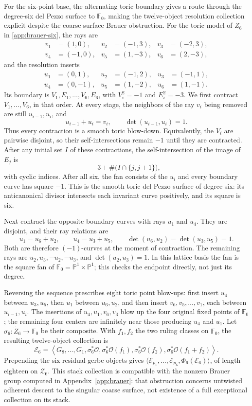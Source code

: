 \documentclass[11pt]{article}
\theoremstyle{plain}
\theoremstyle{definition}
\theoremstyle{remark}
\newcommand{\Pp}{\mathbb P}
\newcommand{\F}{\mathbb F}
\newcommand{\OO}{\mathcal O}
\begin{document}
For the six-point base, the alternating toric boundary gives a route
through the degree-six del Pezzo surface to \(\F_0\), making the
twelve-object resolution collection explicit despite the coarse-surface
Brauer obstruction.
For the toric model of \(Z_6\) in \cref{app:brauer-six}, the rays are
\[
\begin{aligned}
v_1&=(1,0),&v_2&=(-1,3),&v_3&=(-2,3),\\
v_4&=(-1,0),&v_5&=(1,-3),&v_6&=(2,-3),
\end{aligned}
\]
and the resolution inserts
\[
\begin{aligned}
u_1&=(0,1),&u_2&=(-1,2),&u_3&=(-1,1),\\
u_4&=(0,-1),&u_5&=(1,-2),&u_6&=(1,-1).
\end{aligned}
\]
Its boundary is \(V_1,E_1,\ldots,V_6,E_6\), with
\(V_i^2=-1\) and \(E_i^2=-3\). We first contract
\(V_1,\ldots,V_6\), in that order. At every stage, the neighbors
of the ray \(v_i\) being removed are still \(u_{i-1},u_i\), and
\[
u_{i-1}+u_i=v_i,\qquad \det(u_{i-1},u_i)=1.
\]
Thus every contraction is a smooth toric blow-down. Equivalently, the
\(V_i\) are pairwise disjoint, so their self-intersections remain
\(-1\) until they are contracted. After any initial set \(I\) of
these contractions, the self-intersection of the image of \(E_j\) is
\[
-3+\#\bigl(I\cap\{j,j+1\}\bigr),
\]
with cyclic indices. After all six, the fan consists of the \(u_i\)
and every boundary curve has square \(-1\). This is the smooth toric
del Pezzo surface of degree six: its anticanonical divisor intersects
each invariant curve positively, and its square is six.

Next contract the opposite boundary curves with rays \(u_1\) and
\(u_4\). They are disjoint, and their ray relations are
\[
u_1=u_6+u_2,\qquad u_4=u_3+u_5,
\qquad \det(u_6,u_2)=\det(u_3,u_5)=1.
\]
Both are therefore \((-1)\)-curves at the moment of contraction.
The remaining rays are \(u_2,u_3,-u_2,-u_3\), and
\(\det(u_2,u_3)=1\). In this lattice basis the fan is the square
fan of \(\F_0=\Pp^1\times\Pp^1\); this checks the endpoint
directly, not just its degree.

Reversing the sequence prescribes eight toric point blow-ups: first
insert \(u_4\) between \(u_3,u_5\), then \(u_1\) between
\(u_6,u_2\), and then insert \(v_6,v_5,\ldots,v_1\), each
between \(u_{i-1},u_i\). The insertions of \(u_4,u_1,v_6,v_3\)
blow up the four original fixed points of \(\F_0\); the remaining
four centers are infinitely near those producing \(u_4\) and \(u_1\).
Let
\(\sigma_6:\widetilde Z_6\to\F_0\) be their composite. With
\(f_1,f_2\) the two ruling classes on \(\F_0\), the resulting
twelve-object collection is
\[
\mathscr E_6=\left\langle G_8,\ldots,G_1,
\sigma_6^*\OO,\sigma_6^*\OO(f_1),\sigma_6^*\OO(f_2),
\sigma_6^*\OO(f_1+f_2)\right\rangle.
\]
Prepending the six residual-gerbe objects gives
\(\langle\mathcal E_{p_1},\ldots,\mathcal E_{p_6},
\Phi_6(\mathscr E_6)\rangle\), of length eighteen on
\(\mathcal Z_6\). This stack collection is compatible with the
nonzero Brauer group computed in Appendix~\ref{app:brauer}: that
obstruction concerns untwisted adherent descent to the singular coarse
surface, not existence of a full exceptional collection on its stack.
\end{document}
